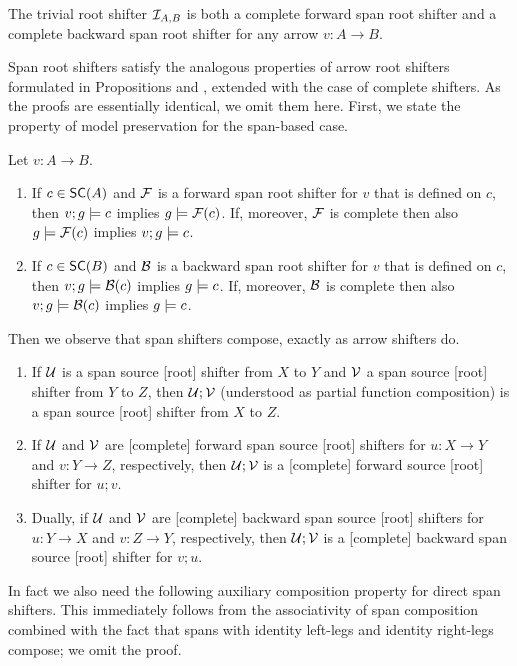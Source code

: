 \begin{proposition}
The trivial root shifter $\mathcal{I}_{A,B}$ is both a complete forward span root shifter and a complete backward span root shifter for any arrow $v:A\to B$. 
\end{proposition}
%
Span root shifters satisfy the analogous properties of arrow root shifters formulated in Propositions  and , extended with the case of complete shifters. As the proofs are essentially identical, we omit them here. First, we state the property of model preservation for the span-based case.

\begin{proposition}
Let $v:A\to B$.
\begin{enumerate}[topsep=\smallskipamount]
\item If $c\in \SC A$ and $\mathcal{F}$ is a forward span root shifter for $v$ that is defined on $c$, then $v;g\models c$ implies $g\models \mathcal{F}(c)$. If, moreover, $\mathcal{F}$ is complete then also $g\models \mathcal{F}(c)$ implies $v;g\models c$.
\item If $c\in \SC B$ and $\mathcal{B}$ is a backward span root shifter for $v$ that is defined on $c$, then $v;g\models \mathcal{B}(c)$ implies $g\models c$. If, moreover, $\mathcal{B}$ is complete then also $v;g\models \mathcal{B}(c)$ implies $g\models c$.
\end{enumerate}
\end{proposition}
%
Then we observe that span shifters compose, exactly as arrow shifters do.
%
\begin{proposition}
\begin{enumerate}[topsep=\smallskipamount]
\item If $\mathcal{U}$ is a span source [root] shifter from $X$ to $Y$ and $\mathcal{V}$ a span source [root] shifter from $Y$ to $Z$, then $\mathcal{U};\mathcal{V}$ (understood as partial function composition) is a span source [root] shifter from $X$ to $Z$. 
\item If $\mathcal{U}$ and $\mathcal{V}$ are [complete] forward span source [root] shifters for $u: X\to Y$ and $v: Y \to Z$, respectively, then $\mathcal{U};\mathcal{V}$ is a [complete] forward source [root] shifter for $u;v$.
\item Dually, if $\mathcal{U}$ and $\mathcal{V}$ are [complete] backward span source [root] shifters for $u: Y\to X$ and $v: Z \to Y$, respectively, then $\mathcal{U};\mathcal{V}$ is a [complete] backward span source [root] shifter for $v;u$.
\end{enumerate}
\end{proposition}
%
In fact we also need the following auxiliary composition property for direct span shifters. This immediately follows from the associativity of span composition combined with the fact that spans with identity left-legs and identity right-legs compose; we omit the proof.

